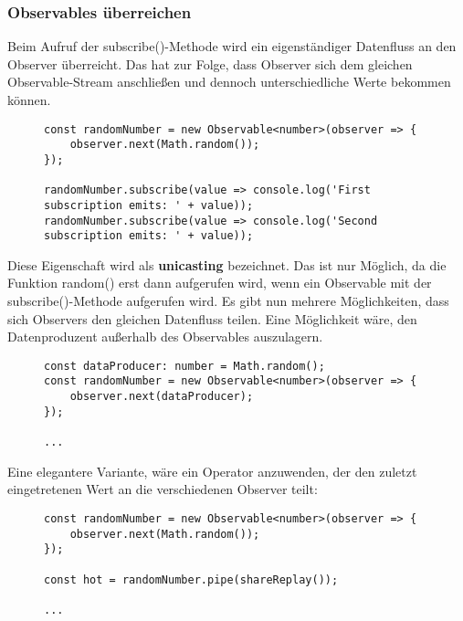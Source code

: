 \subsubsection{Observables überreichen}

Beim Aufruf der subscribe()-Methode wird ein eigenständiger Datenfluss an den Observer überreicht. Das hat zur Folge, dass Observer sich dem gleichen Observable-Stream anschließen und dennoch unterschiedliche Werte bekommen können.

\begin{figure}[H]
\begin{lstlisting}[basicstyle=\small]
const randomNumber = new Observable<number>(observer => {
    observer.next(Math.random());
});

randomNumber.subscribe(value => console.log('First subscription emits: ' + value));
randomNumber.subscribe(value => console.log('Second subscription emits: ' + value));
\end{lstlisting}
\end{figure}

\noindent
Diese Eigenschaft wird als \textbf{unicasting} bezeichnet. Das ist nur Möglich, da die Funktion random() erst dann aufgerufen wird, wenn ein Observable mit der subscribe()-Methode aufgerufen wird. Es gibt nun mehrere Möglichkeiten, dass sich Observers den gleichen Datenfluss teilen. Eine Möglichkeit wäre, den Datenproduzent außerhalb des Observables auszulagern. 

\begin{figure}[H]
\begin{lstlisting}[basicstyle=\small]
const dataProducer: number = Math.random();
const randomNumber = new Observable<number>(observer => {
    observer.next(dataProducer);
});

...
\end{lstlisting}
\end{figure}

\noindent
Eine elegantere Variante, wäre ein Operator anzuwenden, der den zuletzt eingetretenen Wert an die verschiedenen Observer teilt:

\begin{figure}[H]
\begin{lstlisting}[basicstyle=\small]
const randomNumber = new Observable<number>(observer => {
    observer.next(Math.random());
});

const hot = randomNumber.pipe(shareReplay());

...
\end{lstlisting}
\end{figure}

